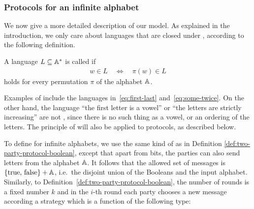 


\subsubsection{Protocols for an infinite alphabet}
\label{sec:protocols-infinite-alphabet}
\AP
We now give a more detailed description of our model. 
As explained in the introduction, we only care about languages that are closed 
under , according to the following definition. 

\begin{definition} \label{def:equivariant-language}
  \AP
  A language $L \subseteq \mathbb A^*$ is called  if 
  \begin{align*}
  w \in L \quad \iff \quad \pi(w) \in L
  \end{align*}
  holds for every permutation $\pi$ of the alphabet $\mathbb A$.
\end{definition}

Examples of  include the languages
in~\eqref{eq:first-last} and~\eqref{eq:some-twice}. On the other hand, the
language ``the first letter is a vowel'' or ``the letters are strictly
increasing'' are not , since there is no such thing as a vowel,
or an ordering of the letters. The principle of  will also be applied to protocols, as described below.


\AP To define  for infinite alphabets, we use the
same kind of  as in Definition \ref{def:two-party-protocol-boolean},
except that apart from bits, the parties can also send letters from the
alphabet $\mathbb A$. It follows that the allowed set of messages is
$\{\text{true, false}\} + \mathbb A$, i.e.~the disjoint union of the Booleans
and the input alphabet. Similarly, to
Definition~\ref{def:two-party-protocol-boolean}, the number of rounds is a
fixed number $k$ and in the $i$-th round each party chooses a new message
according a strategy which is a function of the following type: 

